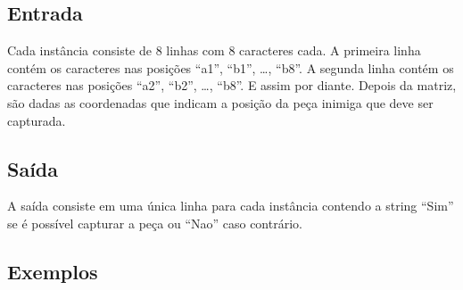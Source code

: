 \subsection*{Entrada}
\textoDiversasInstanciasEOF

Cada instância consiste de 8 linhas com 8 caracteres cada. A primeira linha contém os caracteres nas posições ``a1'', ``b1'', \dots, ``b8''. A segunda linha contém os caracteres nas posições ``a2'', ``b2'', \dots, ``b8''. E assim por diante. Depois da matriz, são dadas as coordenadas que indicam a posição da peça inimiga que deve ser capturada. \\


\subsection*{Saída}

A saída consiste em uma única linha para cada instância contendo a string ``Sim'' se é possível capturar a peça ou ``Nao'' caso contrário.


\subsection*{Exemplos}

